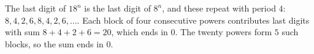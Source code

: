 The last digit of $18^n$ is the last digit of $8^n$, and these repeat with period $4$: $8,4,2,6,8,4,2,6,\dots$. Each block of four consecutive powers contributes last digits with sum $8+4+2+6=20$, which ends in $0$. The twenty powers form $5$ such blocks, so the sum ends in $\boxed{0}$.
